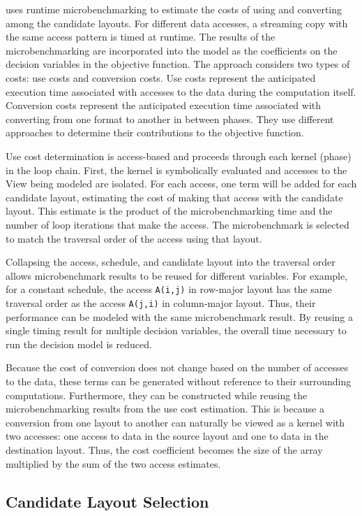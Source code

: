 \FormatDecisions{} uses runtime microbenchmarking to estimate the costs of using and converting among the candidate layouts. 
For different data accesses, a streaming copy with the same access pattern is timed at runtime.
The results of the microbenchmarking are incorporated into the model as the coefficients on the decision variables in the objective function.
The approach considers two types of costs: use costs and conversion costs.
Use costs represent the anticipated execution time associated with accesses to the data during the computation itself.
Conversion costs represent the anticipated execution time associated with converting from one format to another in between phases.
They use different approaches to determine their contributions to the objective function.

Use cost determination is access-based and proceeds through each kernel (phase) in the loop chain.
First, the kernel is symbolically evaluated and accesses to the View being modeled are isolated.
For each access, one term will be added for each candidate layout, estimating the cost of making that access with the candidate layout.
This estimate is the product of the microbenchmarking time and the number of loop iterations that make the access.
The microbenchmark is selected to match the traversal order of the access using that layout.

Collapsing the access, schedule, and candidate layout into the traversal order allows microbenchmark results to be reused for different variables. 
For example, for a constant schedule, the access \verb.A(i,j). in row-major layout has the same traversal order as the access \verb.A(j,i). in column-major layout.
Thus, their performance can be modeled with the same microbenchmark result. 
By reusing a single timing result for multiple decision variables, the overall time necessary to run the decision model is reduced.

Because the cost of conversion does not change based on the number of accesses to the data, these terms can be generated without reference to their surrounding computations.
Furthermore, they can be constructed while reusing the microbenchmarking results from the use cost estimation.
This is because a conversion from one layout to another can naturally be viewed as a kernel with two accesses: one access to data in the source layout and one to data in the destination layout.
Thus, the cost coefficient becomes the size of the array multiplied by the sum of the two access estimates.


\subsection{Candidate Layout Selection}\label{sec:candidateSelection}

